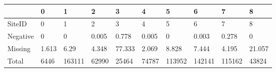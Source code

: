 \begin{tabular}{llllllllll}
\toprule
{} &      0 &       1 &      2 &       3 &      4 &       5 &       6 &       7 &       8 \\
\midrule
SiteID   &      0 &       1 &      2 &       3 &      4 &       5 &       6 &       7 &       8 \\
Negative &      0 &       0 &  0.005 &   0.778 &  0.005 &       0 &   0.003 &   0.278 &       0 \\
Missing  &  1.613 &    6.29 &  4.348 &  77.333 &  2.069 &   8.828 &   7.444 &   4.195 &  21.057 \\
Total    &   6446 &  163111 &  62990 &   25464 &  74787 &  113952 &  142141 &  115162 &   43824 \\
\bottomrule
\end{tabular}
